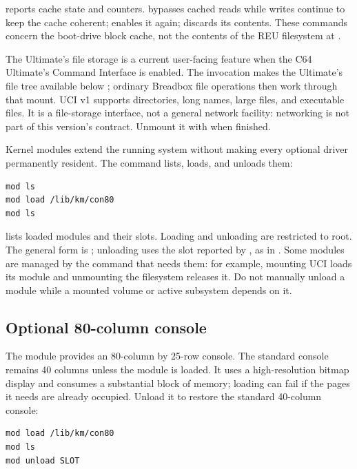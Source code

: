  reports cache state and counters.  bypasses cached reads while writes continue to keep the cache coherent;  enables it again;  discards its contents. These commands concern the boot-drive block cache, not the contents of the REU filesystem at .

The Ultimate's file storage is a current user-facing feature when the C64 Ultimate's Command Interface is enabled. The invocation  makes the Ultimate's file tree available below ; ordinary Breadbox file operations then work through that mount. UCI v1 supports directories, long names, large files, and executable files. It is a file-storage interface, not a general network facility: networking is not part of this version's contract. Unmount it with  when finished.

Kernel modules extend the running system without making every optional driver permanently resident. The  command lists, loads, and unloads them:

\begin{lstlisting}
mod ls
mod load /lib/km/con80
mod ls
\end{lstlisting}

 lists loaded modules and their slots. Loading and unloading are restricted to root. The general form is ; unloading uses the slot reported by , as in . Some modules are managed by the command that needs them: for example, mounting UCI loads its module and unmounting the filesystem releases it. Do not manually unload a module while a mounted volume or active subsystem depends on it.

\subsection{Optional 80-column console}

The  module provides an 80-column by 25-row console. The standard console remains 40 columns unless the module is loaded. It uses a high-resolution bitmap display and consumes a substantial block of memory; loading can fail if the pages it needs are already occupied. Unload it to restore the standard 40-column console:

\begin{lstlisting}
mod load /lib/km/con80
mod ls
mod unload SLOT
\end{lstlisting}

